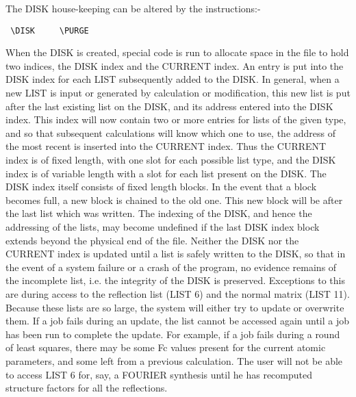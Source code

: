 \documentclass[10pt,a4paper]{report}
\begin{document}
The DISK house-keeping can be altered by the instructions:-



\small\begin{verbatim}
 \DISK     \PURGE
\end{verbatim}\normalsize




When the DISK is created,  special code is run to allocate space in the
 file to hold two indices, the DISK index and the CURRENT index.
 An entry is put into the DISK index for each LIST subsequently added to the
 DISK. In general, when a new LIST is input or generated by calculation
 or modification, this new list is 
 put after the last  existing list on the DISK, and its address entered
 into the DISK index. This index will now contain two or more entries for
 lists of the given type, and so that subsequent calculations will know
 which one to use, the address of the most recent is inserted into the CURRENT
 index. Thus the CURRENT index is of fixed length, with one slot for each 
 possible list type, and the DISK index is of variable length with a slot
 for each list present on the DISK. The DISK index itself consists of fixed
 length blocks. In the event that a block becomes full, a new block is chained
 to the old one. This new block will be after the last list which was written.
 The indexing of the DISK, and hence the addressing of the lists, may become
 undefined if the last DISK index block extends beyond the physical end of the 
 file. Neither the DISK nor the CURRENT index is updated until a list is 
 safely written to the DISK, so that in the event of a system failure or
 a crash of the program, no evidence remains of the incomplete list, i.e. 
 the integrity of the DISK is preserved. Exceptions to this are during
 access to the reflection list (LIST 6) and the normal matrix (LIST 11).
 Because these lists are so large, the system will either try to update or
 overwrite them. If a job fails during an update, the list cannot be accessed
 again until a job has been run to complete the update. For example, if
 a job fails during a round of least squares, there may be some Fc values
 present for the current atomic parameters, and some left from a previous
 calculation. The user will not be able to access LIST 6 for, say, a FOURIER
 synthesis until he has recomputed structure factors for all the reflections.
\end{document}
